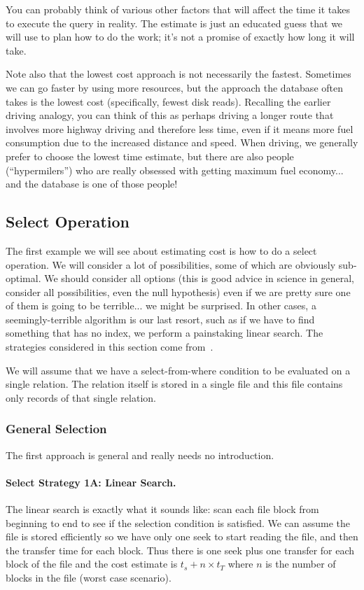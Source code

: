 \documentclass[a4paper]{report}
\begin{document}
You can probably think of various other factors that will affect the time it takes to execute the query in reality. The estimate is just an educated guess that we will use to plan how to do the work; it's not a promise of exactly how long it will take.

Note also that the lowest cost approach is not necessarily the fastest. Sometimes we can go faster by using more resources, but the approach the database often takes is the lowest cost (specifically, fewest disk reads). Recalling the earlier driving analogy, you can think of this as perhaps driving a longer route that involves more highway driving and therefore less time, even if it means more fuel consumption due to the increased distance and speed. When driving, we generally prefer to choose the lowest time estimate, but there are also people (``hypermilers'') who are really obsessed with getting maximum fuel economy... and the database is one of those people!

\subsection*{Select Operation}
The first example we will see about estimating cost is how to do a select operation. We will consider a lot of possibilities, some of which are obviously sub-optimal. We should consider all options (this is good advice in science in general, consider all possibilities, even the null hypothesis) even if we are pretty sure one of them is going to be terrible... we might be surprised. In other cases, a seemingly-terrible algorithm is our last resort, such as if we have to find something that has no index, we perform a painstaking linear search. The strategies considered in this section come from~\cite{dsc}.

We will assume that we have a select-from-where condition to be evaluated on a single relation.  The relation itself is stored in a single file and this file contains only records of that single relation. 

\subsubsection*{General Selection}

The first approach is general and really needs no introduction.

\paragraph{Select Strategy 1A: Linear Search.} The linear search is exactly what it sounds like: scan each file block from beginning to end to see if the selection condition is satisfied. We can assume the file is stored efficiently so we have only one seek to start reading the file, and then the transfer time for each block. Thus there is one seek plus one transfer for each block of the file and the cost estimate is $t_{s} + n \times t_{T}$ where $n$ is the number of blocks in the file (worst case scenario). 
\end{document}
